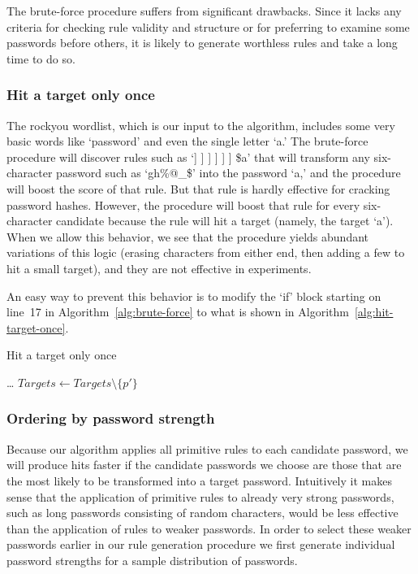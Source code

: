 \documentclass[letterpaper,twocolumn,10pt]{article}
\begin{document}
The brute-force procedure suffers from significant drawbacks. Since it lacks
any criteria for checking rule validity and structure or for preferring to
examine some passwords before others, it is likely to generate worthless rules
and take a long time to do so.

\subsubsection{Hit a target only once}

The rockyou wordlist, which is our input to the algorithm, includes some very
basic words like `password' and even the single letter `a.' The brute-force
procedure will discover rules such as `] ] ] ] ] ] \$a' that will transform any
six-character password such as `gh\%@\_\$' into the password `a,' and the
procedure will boost the score of that rule. But that rule is hardly effective
for cracking password hashes. However, the procedure will boost that rule for
every six-character candidate because the rule will hit a target (namely, the
target `a'). When we allow this behavior, we see that the procedure yields
abundant variations of this logic (erasing characters from either end, then
adding a few to hit a small target), and they are not effective in experiments.

An easy way to prevent this behavior is to modify the `if' block starting on
line~17 in Algorithm~\ref{alg:brute-force} to what is shown in
Algorithm~\ref{alg:hit-target-once}.

\begin{algorithm}\caption{Hit a target only once}
\begin{algorithmic}
        \State \dots
      \EndFor
      \State $Targets \gets Targets \setminus \{p'\}$
    \EndIf
\end{algorithmic}
\label{alg:hit-target-once}
\end{algorithm}

\subsubsection{Ordering by password strength}

Because our algorithm applies all primitive rules to each candidate password,
we will produce hits faster if the candidate passwords we choose are those that
are the most likely to be transformed into a target password. Intuitively it
makes sense that the application of primitive rules to already very strong
passwords, such as long passwords consisting of random characters, would be less
effective than the application of rules to weaker passwords. In order to select
these weaker passwords earlier in our rule generation procedure we first
generate individual password strengths for a sample distribution of passwords.
\end{document}
